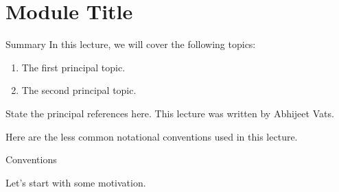 \documentclass[main.tex]{subfiles}
\begin{document}
\newpage
\section{Module Title}
\label{sec:module-title}

\begin{motivation}{\large Summary}{}
In this lecture, we will cover the following topics:
\begin{enumerate}
    \item The first principal topic.
    \item The second principal topic.
\end{enumerate}
State the principal references here.  This lecture was written by Abhijeet
Vats.
\end{motivation}

Here are the less common notational conventions used in this lecture.

\begin{filingbox}[NavyBlue]{Conventions}
\end{filingbox}

\newpage

Let's start with some motivation.

\begin{motiv}
\end{motiv}
\end{document}
